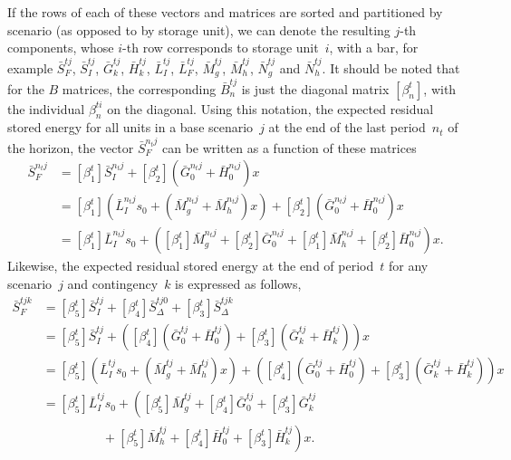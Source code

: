 \documentclass[12pt]{article}
\numberwithin{equation}{section}
\numberwithin{table}{section}
\numberwithin{figure}{section}
\begin{document}
If the rows of each of these vectors and matrices are sorted and partitioned by scenario (as opposed to by storage unit), we can denote the resulting $j$-th components, whose $i$-th row corresponds to storage unit~$i$, with a bar, for example $\bar{S}_F^{tj}$, $\bar{S}_I^{tj}$, $\bar{G}_k^{tj}$, $\bar{H}_k^{tj}$, $\bar{L}_I^{tj}$, $\bar{L}_F^{tj}$, $\bar{M}_g^{tj}$, $\bar{M}_h^{tj}$, $\bar{N}_g^{tj}$ and $\bar{N}_h^{tj}$. It should be noted that for the $B$ matrices, the corresponding $\bar{B}_n^{tj}$ is just the diagonal matrix $[\beta_n^t]$, with the individual $\beta_n^{ti}$ on the diagonal.
Using this notation, the expected residual stored energy for all units in a base scenario~$j$ at the end of the last period~$n_t$ of the horizon, the vector $\bar{S}_F^{n_tj}$ can be written as a function of these matrices
\begin{align}
\bar{S}_F^{n_tj} &= [\beta_1^t] \bar{S}_I^{n_tj} + [\beta_2^t] (\bar{G}_0^{n_tj} + \bar{H}_0^{n_tj}) x \nonumber \\
&= [\beta_1^t] \left(\bar{L}_I^{n_tj} s_0 + (\bar{M}^{n_tj}_g + \bar{M}^{n_tj}_h) x \right) + [\beta_2^t] (\bar{G}_0^{n_tj} + \bar{H}_0^{n_tj}) x \nonumber \\
&= [\beta_1^t] \bar{L}_I^{n_tj} s_0 + \left( [\beta_1^t] \bar{M}^{n_tj}_g + [\beta_2^t] \bar{G}_0^{n_tj} + [\beta_1^t] \bar{M}^{n_tj}_h + [\beta_2^t] \bar{H}_0^{n_tj} \right) x.
\label{eq:SFntj}
\end{align}
Likewise, the expected residual stored energy at the end of period~$t$ for any scenario~$j$ and contingency~$k$ is expressed as follows,
\begin{align}
\bar{S}_F^{tjk} &= [\beta_5^t] \bar{S}_I^{tj} + [\beta_4^t] \bar{S}_\Delta^{tj0} + [\beta_3^t] \bar{S}_\Delta^{tjk} \nonumber \\
&= [\beta_5^t] \bar{S}_I^{tj} + \left( [\beta_4^t] (\bar{G}_0^{tj} + \bar{H}_0^{tj}) + [\beta_3^t] (\bar{G}_k^{tj} +\bar{H}_k^{tj}) \right) x \nonumber \\
&= [\beta_5^t] \left(\bar{L}_I^{tj} s_0 + (\bar{M}^{tj}_g + \bar{M}^{tj}_h) x \right) + \left( [\beta_4^t] (\bar{G}_0^{tj} + \bar{H}_0^{tj}) + [\beta_3^t] (\bar{G}_k^{tj} +\bar{H}_k^{tj}) \right) x \nonumber \\
&= [\beta_5^t] \bar{L}_I^{tj} s_0 + \left( [\beta_5^t] \bar{M}^{tj}_g + [\beta_4^t] \bar{G}_0^{tj} + [\beta_3^t] \bar{G}_k^{tj} \right. \nonumber \\
& \left. \qquad \qquad \;\;\, {} + [\beta_5^t] \bar{M}^{tj}_h + [\beta_4^t] \bar{H}_0^{tj} + [\beta_3^t] \bar{H}_k^{tj} \right) x.
\label{eq:SFtjk}
\end{align}
\end{document}
